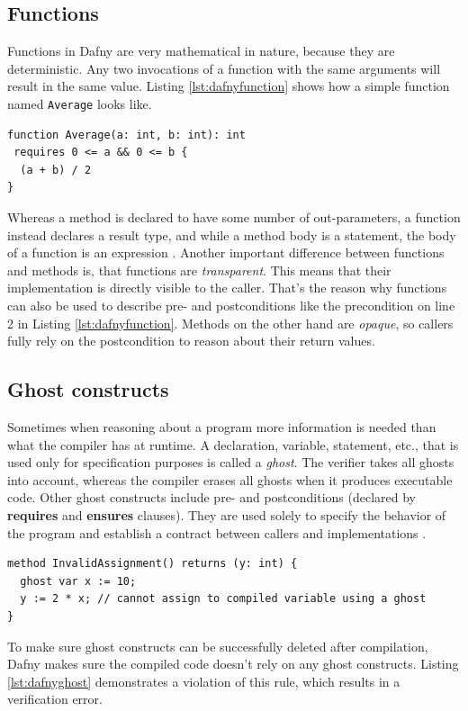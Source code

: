 \documentclass[a4paper]{article}
\begin{document}
\subsection{Functions}
Functions in Dafny are very mathematical in nature, because they are deterministic. Any two invocations of a
function with the same arguments will result in the same value. Listing \ref{lst:dafnyfunction} shows how a simple
function named \texttt{Average} looks like.
\begin{lstlisting}[style=dafnystyle, caption={A simple function in Dafny.}, label={lst:dafnyfunction}]
function Average(a: int, b: int): int 
 requires 0 <= a && 0 <= b {
  (a + b) / 2
}
\end{lstlisting}
Whereas a method is declared to have some number of out-parameters, a function instead declares a result type,
and while a method body is a statement, the body of a function is an expression \cite{leino2023program}.
Another important difference between functions and methods is, that functions are \textit{transparent}. This means
that their implementation is directly visible to the caller. That's the reason why functions can also be used
to describe pre- and postconditions like the precondition on line 2 in Listing \ref{lst:dafnyfunction}.
Methods on the other hand are \textit{opaque}, so callers fully rely on the postcondition to reason about their return values.
\subsection{Ghost constructs}
Sometimes when reasoning about a program more information is needed than what the compiler has at runtime.
A declaration, variable, statement, etc., that is used only for specification purposes is called a \textit{ghost}.
The verifier takes all ghosts into account, whereas the compiler erases all ghosts when it produces executable code.
Other ghost constructs include pre- and postconditions (declared by \textbf{requires} and \textbf{ensures} clauses).
They are used solely to specify the behavior of the program and establish a contract between callers and implementations \cite{leino2023program}.
\begin{lstlisting}[style=dafnystyle, caption={Invalid assignment to ghost.}, label={lst:dafnyghost}]
method InvalidAssignment() returns (y: int) {
  ghost var x := 10;
  y := 2 * x; // cannot assign to compiled variable using a ghost
}
\end{lstlisting}
To make sure ghost constructs can be successfully deleted after compilation, Dafny makes sure the compiled code
doesn't rely on any ghost constructs. Listing \ref{lst:dafnyghost} demonstrates a violation of this rule, which
results in a verification error.
\end{document}
